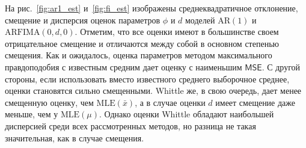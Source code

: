 \documentclass[specialist,
substylefile = spbu_report.rtx,
subf,href,colorlinks=true, 12pt]{disser}
\theoremstyle{definition}
\begin{document}
На рис.~\ref{fig:ar1_est} и~\ref{fig:fi_est} изображены среднеквадратичное отклонение, смещение и дисперсия оценок параметров $\phi$ и $d$ моделей $\mathrm{AR}(1)$ и $\mathrm{ARFIMA}(0, d, 0)$. Отметим, что все оценки имеют в большинстве своем отрицательное смещение и отличаются между собой в основном степенью смещения. Как и ожидалось, оценка параметров методом максимального правдоподобия с известным средним дает оценку с наименьшим $\mathsf{MSE}$. С другой стороны, если использовать вместо известного среднего выборочное среднее, оценки становятся сильно смещенными. Whittle же, в свою очередь, дает менее смещенную оценку, чем $\mathrm{MLE}(\bar x)$, а в случае оценки $d$ имеет смещение даже меньше, чем у $\mathrm{MLE}(\mu)$. Однако оценки Whittle обладают наибольшей дисперсией среди всех рассмотренных методов, но разница не такая значительная, как в случае смещения.
\end{document}
